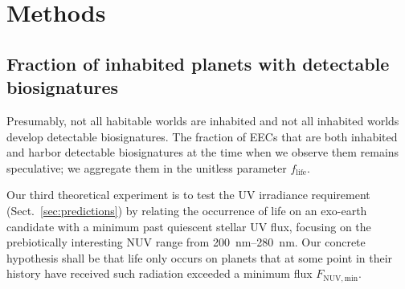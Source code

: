 \documentclass[modern,linenumbers]{aastex631}
\begin{document}
\section{Methods}
\label{sec:hypotests}


\subsection{Fraction of inhabited planets with detectable biosignatures}
Presumably, not all habitable worlds are inhabited and not all inhabited worlds develop detectable biosignatures.
The fraction of \glspl{EEC} that are both inhabited and harbor detectable biosignatures at the time when we observe them remains speculative; we aggregate them in the unitless parameter $f_\mathrm{life}$.

%
%
Our third theoretical experiment is to test the UV irradiance requirement (Sect.~\ref{sec:predictions}) by relating the occurrence of life on an exo-earth candidate with a minimum past quiescent stellar UV flux, focusing on the prebiotically interesting \gls{NUV} range from \SIrange{200}{280}{\nano\meter}.   %
Our concrete hypothesis shall be that life only occurs on planets that at some point in their history have received such radiation exceeded a minimum flux $F_\mathrm{NUV, min}$.
\end{document}

